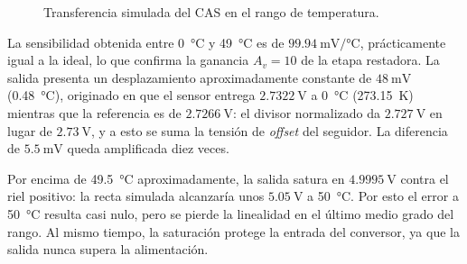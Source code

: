 \begin{figure}[H]
  \centering
  
  \caption{Transferencia simulada del CAS en el rango de temperatura.}
  \label{fig:sim_transferencia}
\end{figure}

La sensibilidad obtenida entre \SI{0}{\celsius} y \SI{49}{\celsius} es de $\SI{99.94}{\milli\volt/\celsius}$,
prácticamente igual a la ideal, lo que confirma la ganancia $A_v = 10$ de la etapa restadora. La salida presenta un
desplazamiento aproximadamente constante de $\SI{48}{\milli\volt}$ (\SI{0.48}{\celsius}), originado en que el sensor
entrega $\SI{2.7322}{\volt}$ a \SI{0}{\celsius} (\SI{273.15}{\kelvin}) mientras que la referencia es de
$\SI{2.7266}{\volt}$: el divisor normalizado da $\SI{2.727}{\volt}$ en lugar de $\SI{2.73}{\volt}$, y a esto se suma la
tensión de \textit{offset} del seguidor. La diferencia de $\SI{5.5}{\milli\volt}$ queda amplificada diez veces.

Por encima de \SI{49.5}{\celsius} aproximadamente, la salida satura en $\SI{4.9995}{\volt}$ contra el riel positivo:
la recta simulada alcanzaría unos $\SI{5.05}{\volt}$ a \SI{50}{\celsius}. Por esto el error a \SI{50}{\celsius}
resulta casi nulo, pero se pierde la linealidad en el último medio grado del rango. Al mismo tiempo, la saturación
protege la entrada del conversor, ya que la salida nunca supera la alimentación.
